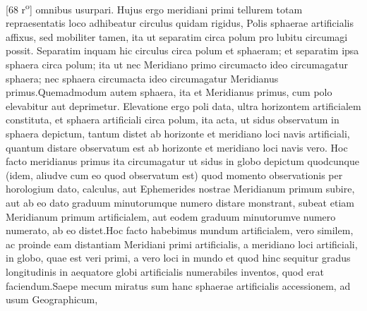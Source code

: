 [68 r\textsuperscript{o}] omnibus  usurpari. Hujus ergo meridiani\protect{} primi tellurem totam repraesentatis loco adhibeatur  circulus quidam rigidus, Polis\protect{} sphaerae artificialis affixus, sed mobiliter tamen, ita ut separatim  circa polum pro lubitu circumagi possit.  Separatim inquam hic circulus circa polum\protect{}  et sphaeram; et separatim ipsa sphaera circa polum\protect{}; ita ut nec Meridiano\protect{} primo circumacto ideo circumagatur sphaera; nec sphaera  circumacta ideo circumagatur Meridianus\protect{}  primus.\pend \pstart Quemadmodum autem sphaera, ita et Meridianus\protect{} primus, cum polo\protect{} elevabitur aut deprimetur. Elevatione ergo poli\protect{} data, ultra horizontem artificialem constituta, et sphaera artificiali circa polum, ita acta, ut sidus observatum in sphaera depictum, tantum distet ab horizonte et meridiano\protect{} loci navis\protect{} artificiali, quantum distare observatum est ab horizonte et meridiano\protect{} loci navis\protect{} vero. Hoc  facto meridianus\protect{} primus ita circumagatur ut sidus\protect{} in globo depictum quodcunque (idem,  aliudve cum eo quod observatum est) quod momento observationis per horologium\protect{} dato, calculus, aut Ephemerides\protect{} nostrae Meridianum\protect{} primum subire, aut ab eo dato graduum minutorumque numero distare monstrant, subeat etiam Meridianum\protect{} primum artificialem, aut eodem graduum minutorumve numero  numerato, ab eo distet.\pend \pstart Hoc facto  habebimus mundum artificialem, vero similem, ac proinde eam distantiam Meridiani\protect{} primi  artificialis, a meridiano\protect{} loci artificiali, in globo, quae est veri primi, a vero loci in mundo et  quod hinc sequitur gradus longitudinis\protect{} in aequatore\protect{} globi artificialis numerabiles inventos, quod erat faciendum.\pend \pstart Saepe mecum miratus sum hanc sphaerae artificialis accessionem, ad usum Geographicum, 